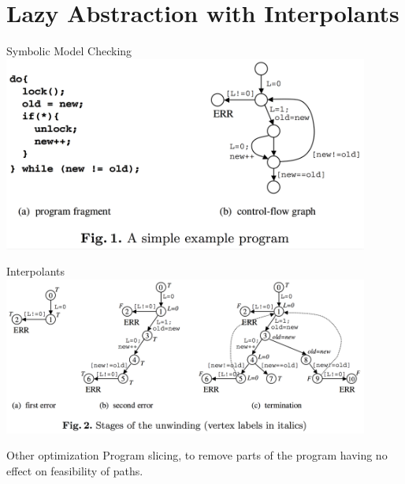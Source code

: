 \documentclass{beamer}
\begin{document}
\section{Lazy Abstraction with Interpolants}

\begin{frame}{Symbolic Model Checking}
  \includegraphics[width=0.9\textwidth]{interpolants_fig1.png}
\end{frame}

\begin{frame}{Interpolants}
  \includegraphics[width=0.9\textwidth]{interpolants_fig2.png}
\end{frame}

\begin{frame}{Other optimization}
  Program slicing, to remove parts of the program having no effect on feasibility of paths.
\end{frame}



\end{document}

